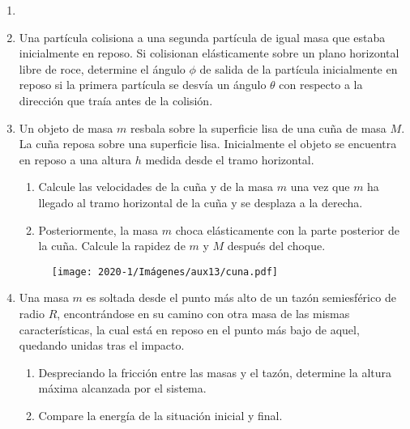 \documentclass[letterpaper,11pt]{article}
\begin{document}
\vspace{-1cm}
\begin{enumerate}\setlength{\itemsep}{0.4cm}


\item[]

\item Una partícula colisiona a una segunda partícula de igual masa que estaba inicialmente en reposo. Si colisionan elásticamente sobre un plano horizontal libre de roce, determine el ángulo $\phi$ de salida de la partícula inicialmente en reposo si la primera partícula se desvía un ángulo $\theta$ con respecto a la dirección que traía antes de la colisión.

\begin{figure}[htbp]
  \centering
  
\end{figure}


\item Un objeto de masa $m$ resbala sobre la superficie lisa de una cuña de masa $M$. La cuña reposa sobre una superficie lisa. Inicialmente el objeto se encuentra en reposo a una altura $h$ medida desde el tramo horizontal.

    \begin{enumerate}
        \item Calcule las velocidades de la cuña y de la masa $m$ una vez que $m$ ha llegado al tramo horizontal de la cuña y se desplaza a la derecha.
        
        \item Posteriormente, la masa $m$ choca elásticamente con la parte posterior de la cuña. Calcule la rapidez de $m$ y $M$ después del choque.
    \end{enumerate}
    
\begin{figure}[H]
    \centering
    \texttt{[image: 2020-1/Imágenes/aux13/cuna.pdf]}
\end{figure}

\item Una masa $m$ es soltada desde el punto más alto de un tazón semiesférico de radio $R$, encontrándose en su camino con otra masa de las mismas características, la cual está en reposo en el punto más bajo de aquel, quedando unidas tras el impacto. 
\begin{enumerate}
    \item Despreciando la fricción entre las masas y el tazón, determine la altura máxima alcanzada por el sistema. 
    \item Compare la energía de la situación inicial y final.
\end{enumerate}


\end{enumerate}
\end{document}
